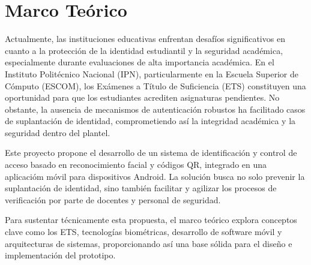 \chapter{Marco Teórico}
\label{cap:MarcoTeorico}

	Actualmente, las instituciones educativas enfrentan desafíos significativos en cuanto a la protección de la identidad estudiantil y la seguridad académica, especialmente durante evaluaciones de alta importancia académica. En el Instituto Politécnico Nacional (IPN), particularmente en la Escuela Superior de Cómputo (ESCOM), los Exámenes a Título de Suficiencia (ETS) constituyen una oportunidad para que los estudiantes acrediten asignaturas pendientes. No obstante, la ausencia de mecanismos de autenticación robustos ha facilitado casos de suplantación de identidad, comprometiendo así la integridad académica y la seguridad dentro del plantel.
	
	Este proyecto propone el desarrollo de un sistema de identificación y control de acceso basado en reconocimiento facial y códigos QR, integrado en una aplicacióm móvil para dispositivos Android. La solución busca no solo prevenir la suplantación de identidad, sino también facilitar y agilizar los procesos de verificación por parte de docentes y personal de seguridad. 
	
	Para sustentar técnicamente esta propuesta, el marco teórico explora conceptos clave como los ETS, tecnologías biométricas, desarrollo de software móvil y arquitecturas de sistemas, proporcionando así una base sólida para el diseño e implementación del prototipo.
	














